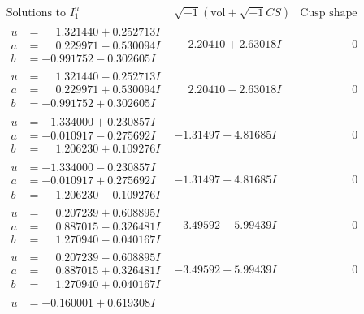 \documentclass[1p]{elsarticle_modified}
\theoremstyle{definition}
\newcommand{\I}{\sqrt{-1}}
\begin{document}
$$\begin{array}{c|c|c}
\text{Solutions to }I^u_{1}& \I (\text{vol} + \sqrt{-1}CS) & \text{Cusp shape}\\
 \hline 
\begin{aligned}
u &= \phantom{-}1.321440 + 0.252713 I \\
a &= \phantom{-}0.229971 - 0.530094 I \\
b &= -0.991752 - 0.302605 I\end{aligned}
 & \phantom{-}2.20410 + 2.63018 I & \phantom{-0.000000 } 0 \\ \hline\begin{aligned}
u &= \phantom{-}1.321440 - 0.252713 I \\
a &= \phantom{-}0.229971 + 0.530094 I \\
b &= -0.991752 + 0.302605 I\end{aligned}
 & \phantom{-}2.20410 - 2.63018 I & \phantom{-0.000000 } 0 \\ \hline\begin{aligned}
u &= -1.334000 + 0.230857 I \\
a &= -0.010917 - 0.275692 I \\
b &= \phantom{-}1.206230 + 0.109276 I\end{aligned}
 & -1.31497 - 4.81685 I & \phantom{-0.000000 } 0 \\ \hline\begin{aligned}
u &= -1.334000 - 0.230857 I \\
a &= -0.010917 + 0.275692 I \\
b &= \phantom{-}1.206230 - 0.109276 I\end{aligned}
 & -1.31497 + 4.81685 I & \phantom{-0.000000 } 0 \\ \hline\begin{aligned}
u &= \phantom{-}0.207239 + 0.608895 I \\
a &= \phantom{-}0.887015 - 0.326481 I \\
b &= \phantom{-}1.270940 - 0.040167 I\end{aligned}
 & -3.49592 + 5.99439 I & \phantom{-0.000000 } 0 \\ \hline\begin{aligned}
u &= \phantom{-}0.207239 - 0.608895 I \\
a &= \phantom{-}0.887015 + 0.326481 I \\
b &= \phantom{-}1.270940 + 0.040167 I\end{aligned}
 & -3.49592 - 5.99439 I & \phantom{-0.000000 } 0 \\ \hline\begin{aligned}
u &= -0.160001 + 0.619308 I \\

\end{aligned}
\end{array}$$
\end{document}
